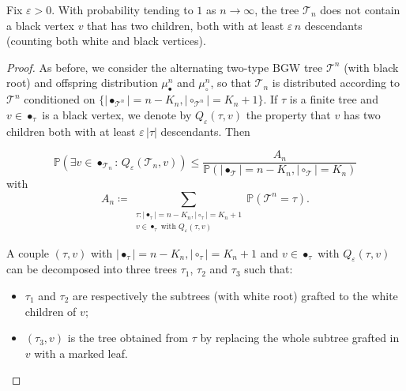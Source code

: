 \documentclass[AHL,XML,longabstracts,Unicode]{cedram}
\providecommand{\abs}[1]{\lvert#1\rvert}
\def\eps{\varepsilon}
\def\mubn{\mu_{\bullet}^{n}}
\def\mucn{\mu_{\circ}^{n}}
\newcommand\BGW{\textrm{BGW}}
\def\Ts{\mathscr{T}}
\renewcommand{\epsilon}{\varepsilon}
\renewcommand\Pr[1]{\mathbb{P}\left(#1\right)}
\begin{document}
\begin{lemma}\label{lem:two}
Fix $\epsilon>0$. With probability tending to $1$ as $n \rightarrow \infty$, the tree $\Ts_{n}$ does not contain a black
  vertex $v$ that has two children, both with at least $\eps \, n$ descendants (counting both white and black vertices).  \label{lem:PasDeuxGrandsSousArbres}
\end{lemma}
\begin{proof}
As before, we consider the alternating two-type $\BGW$ tree $\Ts^{n}$ (with black root) and offspring distribution
  $\mubn$ and $\mucn$, so that $\Ts_{n}$ is distributed according to $\Ts^{n}$ conditioned on
  \hbox{$\{ \abs{\bullet_{\Ts^{n}}}=n-K_n, \abs{\circ_{\Ts^{n}}} =K_n+1\}$}.
  If $\tau$ is a finite tree and $v \in \bullet_{\tau}$ is a black vertex, we denote by
  $Q_\eps(\tau,v)$ the property that $v$ has two children both with at least $\eps \, |\tau|$ descendants. Then

  \[    \Pr{\exists v \in \bullet_{\Ts_{n}}: \, Q_\eps(\Ts_{n},v)} \le \frac{A_{n}}{\Pr{\abs{\bullet_{\Ts}}=n-K_n, \abs{\circ_{\Ts}} =K_n}}\]
  with \[A_{n} \coloneqq \sum_{\substack{\tau: \abs{\bullet_{\tau}}=n-K_n, \abs{\circ_{\tau}} =K_n+1  \\v \in \bullet_{\tau} \textrm{ with } Q_\eps(\tau,v)}} \Pr{\Ts^{n}=\tau}.\]

  A couple $(\tau,v)$ with $\abs{\bullet_{\tau}}=n-K_n, \abs{\circ_{\tau}} =K_n+1$ and $v \in \bullet_{\tau} $ with $Q_\eps(\tau,v)$
 can be decomposed into three trees $\tau_{1}$, $\tau_{2}$ and $\tau_{3}$ such that:
  \begin{itemize}
    \item $\tau_{1}$ and $\tau_{2}$ are respectively the subtrees (with white root) grafted to the white children of $v$;
    \item $(\tau_{3},v)$ is the tree
      obtained from $\tau$ by replacing the whole subtree grafted in $v$ with a marked leaf.
  \end{itemize}


\end{proof}
\end{document}
